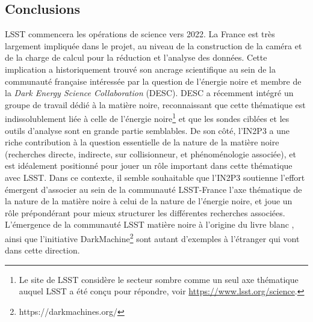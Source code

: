 \documentclass[12pt]{article}
\begin{document}

\vspace{-1em} \subsection*{Conclusions} \vspace{-0.5em}

LSST commencera les opérations de science vers 2022. La France est très largement impliquée dans le projet, au niveau de la construction de la caméra et de la charge de calcul pour la réduction et l'analyse des données. Cette implication a historiquement trouvé son ancrage scientifique au sein de la communauté française intéressée par la question de l'énergie noire et membre de la {\it Dark Energy Science Collaboration} (DESC). DESC a récemment intégré un groupe de travail dédié à la matière noire, reconnaissant que cette thématique est indissolublement liée à celle de l'énergie noire\footnote{Le site de LSST considère le secteur sombre comme un seul axe thématique auquel LSST a été conçu pour répondre, voir \href{https://www.lsst.org/science}{https://www.lsst.org/science}. } et que les sondes ciblées et les outils d'analyse sont en grande partie semblables.
De son côté, l'IN2P3 a une riche contribution à la question essentielle de la nature de la matière noire (recherches directe, indirecte, sur collisionneur, et phénoménologie associée), et est idéalement positionné pour jouer un rôle important dans cette thématique avec LSST. Dans ce contexte, il semble souhaitable que l'IN2P3 soutienne l'effort émergent d'associer au sein de la communauté LSST-France l'axe thématique de la nature de la matière noire à celui de la nature de l'énergie noire, et joue un rôle prépondérant pour mieux structurer les différentes recherches associées. L'émergence de la communauté LSST matière noire à l'origine du livre blanc \citep{drlica-wagner_2019_lsst_dark_matter}, ainsi que l'initiative {\sc DarkMachine}\footnote{https://darkmachines.org/} sont autant d'exemples à l'étranger qui vont dans cette direction.
\end{document}
